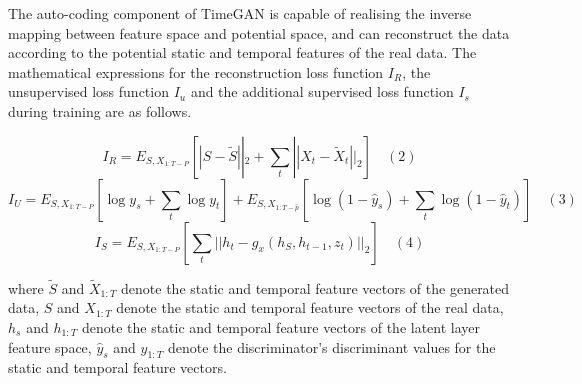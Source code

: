 \documentclass[journal,article,submit,pdftex,moreauthors]{Definitions/mdpi}
\begin{document}
The auto-coding component of TimeGAN is capable of realising the inverse mapping between feature space and potential space, and can reconstruct the data according to the potential static and temporal features of the real data. The mathematical expressions for the reconstruction loss function \({{I}_{R}}\), the unsupervised loss function \({{I}_{u}}\) and the additional supervised loss function \({{I}_{s}}\) during training are as follows.

$$ I _ { R } = E _ { S , X _ { 1: T - P } } \left[ | S - \tilde { S } | | _ { 2 } + \sum _ { t } | | X _ { t } - \tilde { X } _ { t } | | _ { 2 } \right]\quad (2)$$
$$ I _ { U } = E _ { S , X _ {1: T- P } } \left[ \log y _ { s } + \sum _ { t } \log y _ { t } \right] + E _ { S , X _ { 1: T - \widehat { p } } } \left[ \log ( 1 - \widehat { y } _ { s } ) + \sum _ { t } \log ( 1 - \widehat { y } _ { t } ) \right]\quad (3)$$
$$ I _ { S } = E _ { S , X _ { 1: T - P } } \left[ \sum _ { t } | | h _ { t } - g _ { x } ( h _ { S } , h _ { t - 1 } , z _ { t } ) | | _ { 2 } \right]\quad (4)$$

where \({{\widetilde{S}}}\) and \({{\widetilde{X}}_{1:T}}\) denote the static and temporal feature vectors of the generated data,  \({S}\) and \({X}_{1:T}\) denote the static and temporal feature vectors of the real data,  \({h}_{s}\) and  \({h}_{1:T}\) denote the static and temporal feature vectors of the latent layer feature space, \({{\widehat{y}}_{s}}\) and  \({{\widehat{y}}_{1:T}}\) denote the discriminator's discriminant values for the static and temporal feature vectors.
\end{document}
